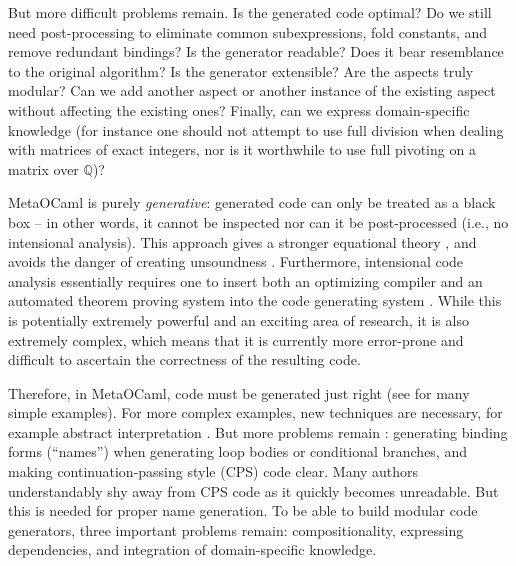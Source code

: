 \documentclass{elsart}
\begin{document}
But more difficult problems remain. Is the generated code optimal? Do
we still need post-processing to eliminate common subexpressions,
fold constants, and remove redundant bindings? Is the generator readable?
Does it bear resemblance to the original algorithm? Is the generator
extensible? Are the aspects truly modular? Can we add another aspect or
another instance of the existing aspect without affecting the existing ones?
Finally, can we express domain-specific knowledge (for instance one should not
attempt to use full division when dealing with matrices of exact integers, nor
is it worthwhile to use full pivoting on a matrix over $\mathbb Q$)?

MetaOCaml is purely \emph{generative}: generated code can only be treated as
a black box -- in other words, it cannot be inspected nor can it be
post-processed (i.e., no intensional analysis). This approach gives a stronger
equational theory \cite{Taha2000}, and avoids the danger of creating
unsoundness \cite{TahaThesis}. Furthermore, intensional code analysis
essentially requires one to insert both an optimizing compiler and an
automated theorem proving system into the code generating system
\cite{Pueschel:05,Kennedy01Telescoping,dongarra7,Veldhuizen:2004}.
While this is potentially extremely powerful and an exciting area of
research, it is also extremely complex, which means that it is
currently more error-prone and difficult to ascertain the correctness
of the resulting code.

Therefore, in MetaOCaml, code must be generated just right (see
\cite{TahaThesis} for many simple examples).  For more complex
examples, new techniques are necessary, for example abstract interpretation
\cite{KiselyovTaha}.  But more problems remain
\cite{scp-CohenDGHKP06}: generating binding forms (``names'')
when generating loop bodies or conditional branches, and making
continuation-passing style (CPS) code clear.  Many authors
understandably shy away from CPS code as it quickly becomes
unreadable.  But this is needed for proper name generation.
To be able to build modular code generators, three important problems
remain: compositionality, expressing dependencies, and integration of
domain-specific knowledge.
\end{document}
